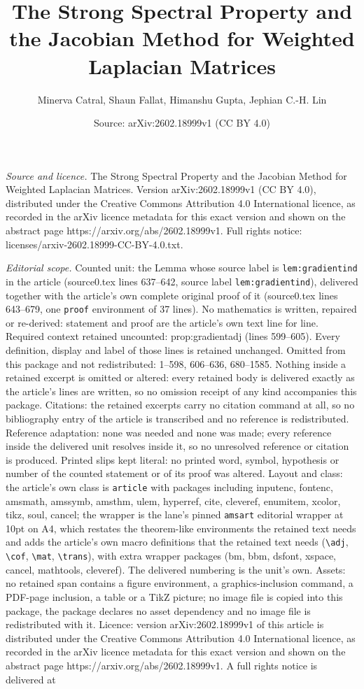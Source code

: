 \documentclass[10pt,a4paper]{amsart}
\title[The Strong Spectral Property and the Jacobian Method for Wei]{The Strong Spectral Property and the Jacobian Method for Weighted Laplacian Matrices}
\author{Minerva Catral, Shaun Fallat, Himanshu Gupta, Jephian C.-H. Lin}
\date{Source: arXiv:2602.18999v1 (CC BY 4.0)}
\begin{document}
\maketitle

\noindent\emph{Source and licence.} The Strong Spectral Property and the Jacobian Method for Weighted Laplacian Matrices. Version arXiv:2602.18999v1 (CC BY 4.0), distributed under the Creative Commons Attribution 4.0 International licence, as recorded in the arXiv licence metadata for this exact version and shown on the abstract page https://arxiv.org/abs/2602.18999v1. Full rights notice: licenses/arxiv-2602.18999-CC-BY-4.0.txt.\par\smallskip

\noindent\textit{Editorial scope.} Counted unit: the Lemma whose source label is \texttt{lem:gradientind} in the article (source0.tex lines 637--642, source label \texttt{lem:gradientind}), delivered together with the article's own complete original proof of it (source0.tex lines 643--679, one \texttt{proof} environment of 37 lines). No mathematics is written, repaired or re-derived: statement and proof are the article's own text line for line. Required context retained uncounted: prop:gradientadj (lines 599--605). Every definition, display and label of those lines is retained unchanged. Omitted from this package and not redistributed: 1--598, 606--636, 680--1585. Nothing inside a retained excerpt is omitted or altered: every retained body is delivered exactly as the article's lines are written, so no omission receipt of any kind accompanies this package. Citations: the retained excerpts carry no citation command at all, so no bibliography entry of the article is transcribed and no reference is redistributed. Reference adaptation: none was needed and none was made; every reference inside the delivered unit resolves inside it, so no unresolved reference or citation is produced. Printed slips kept literal: no printed word, symbol, hypothesis or number of the counted statement or of its proof was altered. Layout and class: the article's own class is \texttt{article} with packages including inputenc, fontenc, amsmath, amssymb, amsthm, ulem, hyperref, cite, cleveref, enumitem, xcolor, tikz, soul, cancel; the wrapper is the lane's pinned \texttt{amsart} editorial wrapper at 10pt on A4, which restates the theorem-like environments the retained text needs and adds the article's own macro definitions that the retained text needs (\texttt{\textbackslash adj}, \texttt{\textbackslash cof}, \texttt{\textbackslash mat}, \texttt{\textbackslash trans}), with extra wrapper packages (bm, bbm, dsfont, xspace, cancel, mathtools, cleveref). The delivered numbering is the unit's own. Assets: no retained span contains a figure environment, a graphics-inclusion command, a PDF-page inclusion, a table or a TikZ picture; no image file is copied into this package, the package declares no asset dependency and no image file is redistributed with it. Licence: version arXiv:2602.18999v1 of this article is distributed under the Creative Commons Attribution 4.0 International licence, as recorded in the arXiv licence metadata for this exact version and shown on the abstract page https://arxiv.org/abs/2602.18999v1. A full rights notice is delivered at 
\end{document}
